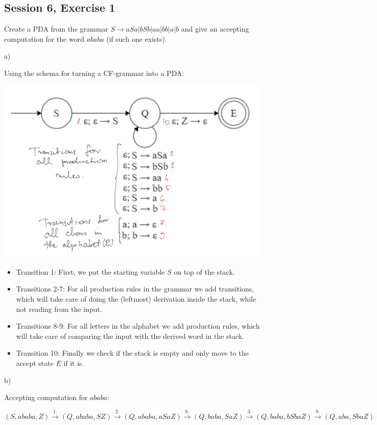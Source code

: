 \subsection {Session 6, Exercise 1}


Create a PDA from the grammar $S \rightarrow aSa|bSb|aa|bb|a|b$ and give an accepting computation for the word $ababa$ (if such one exists).


a)

Using the schema for turning a CF-grammar into a PDA:

\includegraphics[width=\linewidth]{06/6_1.png}

\begin{itemize}
    \item Transition 1: First, we put the starting variable $S$ on top of the stack.
    \item Transitions 2-7: For all production rules in the grammar we add transitions, which will take care of doing the (leftmost) derivation inside the stack, while not reading from the input.
    \item Transitions 8-9: For all letters in the alphabet we add production rules, which will take care of comparing the input with the derived word in the stack.
    \item Transition 10: Finally we check if the stack is empty and only move to the accept state $E$ if it is.
\end{itemize}

b)

Accepting computation for $ababa$:

$(S, ababa, Z)
\xrightarrow{1.} (Q, ababa, SZ)
\xrightarrow{2.} (Q, ababa, aSaZ)
\xrightarrow{8.} (Q, baba, SaZ)
\xrightarrow{3.} (Q, baba, bSbaZ)
\xrightarrow{9.} (Q, aba, SbaZ)
\xrightarrow{6.} (Q, aba, abaZ)
\xrightarrow{8.} (Q, ba, baZ)
\xrightarrow{9.} (Q, a, aZ)
\xrightarrow{8.} (Q, \varepsilon, Z)
\xrightarrow{10.} (E, \varepsilon, \varepsilon)$
